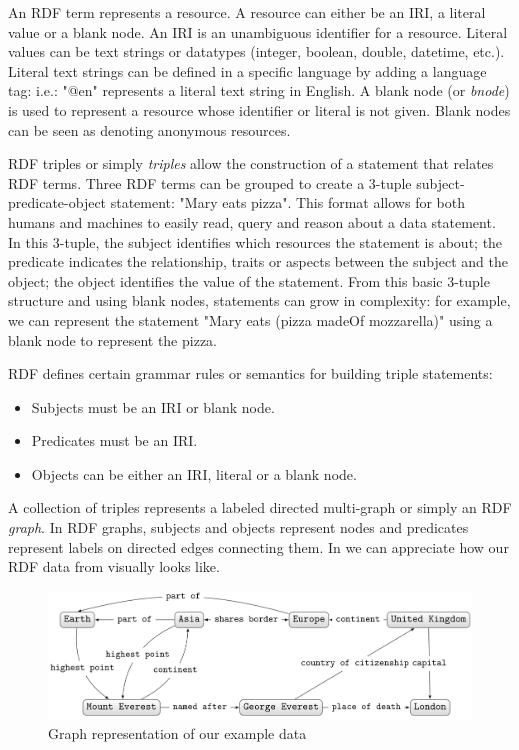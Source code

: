An RDF term represents a resource. A resource can either be an IRI, a literal value or a blank node. An IRI is an unambiguous identifier for a resource. Literal values can be text strings or datatypes (integer, boolean, double, datetime, etc.). Literal text strings can be defined in a specific language by adding a language tag: i.e.: "@en" represents a literal text string in English. A blank node (or \textit{bnode}) is used to represent a resource whose identifier or literal is not given. Blank nodes can be seen as denoting anonymous resources.

RDF triples or simply \textit{triples} allow the construction of a statement that relates RDF terms. Three RDF terms can be grouped to create a 3-tuple subject-predicate-object statement: "Mary eats pizza". This format allows for both humans and machines to easily read, query and reason about a data statement. 
In this 3-tuple, the subject identifies which resources the statement is about; the predicate indicates the relationship, traits or aspects between the subject and the object; the object identifies the value of the statement. From this basic 3-tuple structure and using blank nodes, statements can grow in complexity: for example, we can represent the statement "Mary eats (pizza madeOf mozzarella)" using a blank node to represent the pizza.

RDF defines certain grammar rules or semantics \cite{RDFSemantics} for building triple statements:
\begin{itemize}
    \item Subjects must be an IRI or blank node.
    \item Predicates must be an IRI.
    \item Objects can be either an IRI, literal or a blank node.
\end{itemize}

A collection of triples represents a labeled directed multi-graph or simply an RDF \textit{graph}. In RDF graphs, subjects and objects represent nodes and predicates represent labels on directed edges connecting them. In  we can appreciate how our RDF data from  visually looks like.

\begin{figure}[h!]
    \centering
        \includegraphics[width=.9\linewidth]{imagenes/exampleGrapha.png}
        \caption{Graph representation of our  example data~\cite{Moreno2018}}
        \label{fig:bobMarleyExampleGraph}
\end{figure}

